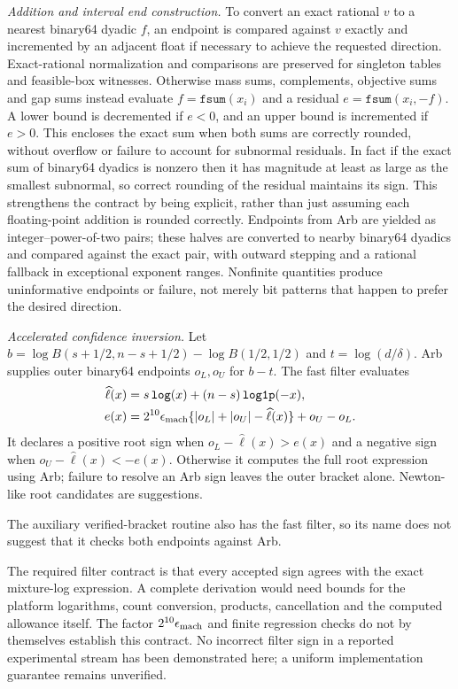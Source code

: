 \emph{Addition and interval end construction.} To convert an exact rational $v$ to a nearest binary64 dyadic $f$, an endpoint is compared against $v$ exactly and incremented by an adjacent float if necessary to achieve the requested direction. Exact-rational normalization and comparisons are preserved for singleton tables and feasible-box witnesses. Otherwise mass sums, complements, objective sums and gap sums instead evaluate $f=\texttt{fsum}(x_i)$ and a residual $e=\texttt{fsum}(x_i,-f)$. A lower bound is decremented if $e<0$, and an upper bound is incremented if $e>0$. This encloses the exact sum when both sums are correctly rounded, without overflow or failure to account for subnormal residuals. In fact if the exact sum of binary64 dyadics is nonzero then it has magnitude at least as large as the smallest subnormal, so correct rounding of the residual maintains its sign. This strengthens the contract by being explicit, rather than just assuming each floating-point addition is rounded correctly. Endpoints from Arb are yielded as integer--power-of-two pairs; these halves are converted to nearby binary64 dyadics and compared against the exact pair, with outward stepping and a rational fallback in exceptional exponent ranges. Nonfinite quantities produce uninformative endpoints or failure, not merely bit patterns that happen to prefer the desired direction.

\emph{Accelerated confidence inversion.} Let $b=\log B(s+1/2,n-s+1/2)-\log B(1/2,1/2)$ and $t=\log(d/\delta)$. Arb supplies outer binary64 endpoints $o_L,o_U$ for $b-t$. The fast filter evaluates
\begin{align}
 \widehat\ell(x)&=s\,\texttt{log}(x)+(n-s)\,\texttt{log1p}(-x),\\
 e(x)&=2^{10}\epsilon_{\rm mach}
       \{|o_L|+|o_U|-\widehat\ell(x)\}+o_U-o_L.
\end{align}
It declares a positive root sign when $o_L-\widehat\ell(x)>e(x)$ and a negative sign when $o_U-\widehat\ell(x)<-e(x)$. Otherwise it computes the full root expression using Arb; failure to resolve an Arb sign leaves the outer bracket alone. Newton-like root candidates are suggestions. 

The auxiliary verified-bracket routine also has the fast filter, so its name does not suggest that it checks both endpoints against Arb.

The required filter contract is that every accepted sign agrees with the exact mixture-log expression. A complete derivation would need bounds for the platform logarithms, count conversion, products, cancellation and the computed allowance itself. The factor $2^{10}\epsilon_{\rm mach}$ and finite regression checks do not by themselves establish this contract. No incorrect filter sign in a reported experimental stream has been demonstrated here; a uniform implementation guarantee remains unverified.

